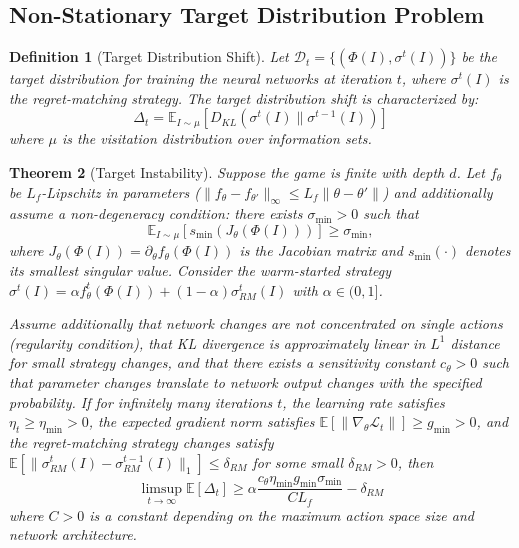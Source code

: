 \documentclass[12pt,a4paper]{article}
\newtheorem{theorem}{Theorem}[section]
\newtheorem{definition}[theorem]{Definition}
\begin{document}
\subsection{Non-Stationary Target Distribution Problem}

\begin{definition}[Target Distribution Shift]
Let $\mathcal{D}_t = \{(\Phi(I), \sigma^t(I))\}$ be the target distribution for training the neural networks at iteration $t$, where $\sigma^t(I)$ is the regret-matching strategy. The target distribution shift is characterized by:
$$\Delta_t = \mathbb{E}_{I \sim \mu}[D_{KL}(\sigma^t(I) \| \sigma^{t-1}(I))]$$
where $\mu$ is the visitation distribution over information sets.
\end{definition}

\begin{theorem}[Target Instability]
\label{thm:target_instability}
Suppose the game is finite with depth $d$. Let $f_\theta$ be $L_f$-Lipschitz in parameters ($\|f_\theta - f_{\theta'}\|_\infty \leq L_f\|\theta - \theta'\|$) and additionally assume a non-degeneracy condition: there exists $\sigma_{\min} > 0$ such that 
$$\mathbb{E}_{I \sim \mu}[s_{\min}(J_\theta(\Phi(I)))] \geq \sigma_{\min},$$
where $J_\theta(\Phi(I)) = \partial_\theta f_\theta(\Phi(I))$ is the Jacobian matrix and $s_{\min}(\cdot)$ denotes its smallest singular value. Consider the warm-started strategy $\sigma^t(I) = \alpha f_\theta^t(\Phi(I)) + (1-\alpha) \sigma_{RM}^t(I)$ with $\alpha \in (0,1]$. 

Assume additionally that network changes are not concentrated on single actions (regularity condition), that KL divergence is approximately linear in $L^1$ distance for small strategy changes, and that there exists a sensitivity constant $c_\theta > 0$ such that parameter changes translate to network output changes with the specified probability. If for infinitely many iterations $t$, the learning rate satisfies $\eta_t \geq \eta_{\min} > 0$, the expected gradient norm satisfies $\mathbb{E}[\|\nabla_\theta \mathcal{L}_t\|] \geq g_{\min} > 0$, and the regret-matching strategy changes satisfy $\mathbb{E}[\|\sigma_{RM}^t(I) - \sigma_{RM}^{t-1}(I)\|_1] \leq \delta_{RM}$ for some small $\delta_{RM} > 0$, then
$$\limsup_{t \rightarrow \infty} \mathbb{E}[\Delta_t] \geq \alpha \frac{c_\theta \eta_{\min} g_{\min} \sigma_{\min}}{CL_f} - \delta_{RM}$$
where $C > 0$ is a constant depending on the maximum action space size and network architecture.
\end{theorem}
\end{document}

